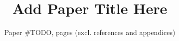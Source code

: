 \documentclass[10pt,sigconf,balance,anonymous,nonacm]{acmart}
\begin{document}
\title{Add Paper Title Here}
\subtitle{Paper \#TODO, \pageref{lastbodypage} pages (excl. references and appendices)}







\maketitle


%
%
%
%
%
%

%

\label{lastbodypage}




%

\label{lastpage}
\end{document}

